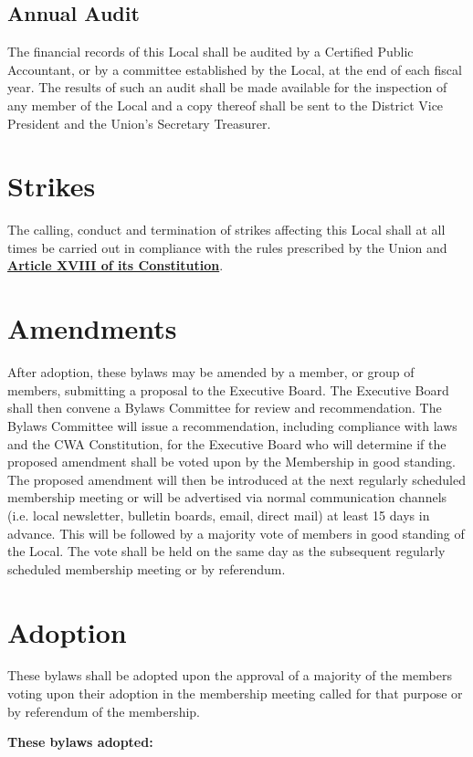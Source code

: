 \documentclass[11pt]{article}
\let\oldhref\href
\renewcommand{\href}[2]{\oldhref{#1}{\bfseries#2}}
\begin{document}
\subsection{Annual Audit}
The financial records of this Local shall be audited by a Certified Public Accountant, or by a committee established by the Local, at the end of each fiscal year. The results of such an audit shall be made available for the inspection of any member of the Local and a copy thereof shall be sent to the District Vice President and the Union’s Secretary Treasurer.

\section{Strikes}
The calling, conduct and termination of strikes affecting this Local shall at all times be carried out in compliance with the rules prescribed by the Union and \href{https://cwa-union.org/for-locals/cwa-constitution\#A18}{Article XVIII of its Constitution}.

\section{Amendments}\label{amendments}
After adoption, these bylaws may be amended by a member, or group of members, submitting a proposal to the Executive Board. The Executive Board shall then convene a Bylaws Committee for review and recommendation. The Bylaws Committee will issue a recommendation, including compliance with laws and the CWA Constitution, for the Executive Board who will determine if the proposed amendment shall be voted upon by the Membership in good standing. The proposed amendment will then be introduced at the next regularly scheduled membership meeting or will be advertised via normal communication channels (i.e. local newsletter, bulletin boards, email, direct mail) at least 15 days in advance. This will be followed by a majority vote of members in good standing of the Local. The vote shall be held on the same day as the subsequent regularly scheduled membership meeting or by referendum.

\section{Adoption}
These bylaws shall be adopted upon the approval of a majority of the members voting upon their adoption in the membership meeting called for that purpose or by referendum of the membership.

\vspace{1cm}
\large{\textbf{These bylaws adopted:} \date{September 19, 2022}}
\end{document}
